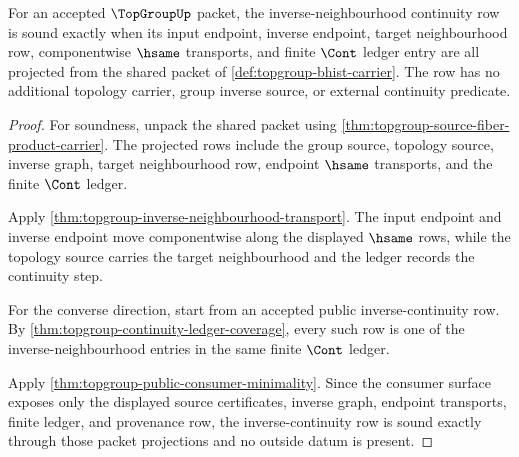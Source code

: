 \begin{theorem}
\label{thm:topgroup-inverse-cont-ledger-soundness}
For an accepted $\TopGroupUp$ packet, the inverse-neighbourhood continuity row
is sound exactly when its input endpoint, inverse endpoint, target
neighbourhood row, componentwise $\hsame$ transports, and finite $\Cont$ ledger
entry are all projected from the shared packet of
\autoref{def:topgroup-bhist-carrier}. The row has no additional topology carrier,
group inverse source, or external continuity predicate.
\end{theorem}
\begin{proof}
For soundness, unpack the shared packet using
\autoref{thm:topgroup-source-fiber-product-carrier}. The projected rows include
the group source, topology source, inverse graph, target neighbourhood row,
endpoint $\hsame$ transports, and the finite $\Cont$ ledger.

Apply \autoref{thm:topgroup-inverse-neighbourhood-transport}. The input endpoint
and inverse endpoint move componentwise along the displayed $\hsame$ rows, while
the topology source carries the target neighbourhood and the ledger records the
continuity step.

For the converse direction, start from an accepted public inverse-continuity
row. By \autoref{thm:topgroup-continuity-ledger-coverage}, every such row is one
of the inverse-neighbourhood entries in the same finite $\Cont$ ledger.

Apply \autoref{thm:topgroup-public-consumer-minimality}. Since the consumer
surface exposes only the displayed source certificates, inverse graph, endpoint
transports, finite ledger, and provenance row, the inverse-continuity row is
sound exactly through those packet projections and no outside datum is present.
\end{proof}


